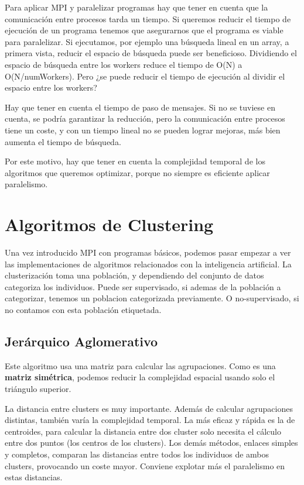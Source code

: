 \vspace*{0.3cm}

Para aplicar MPI y paralelizar programas hay que tener en cuenta que la comunicación entre procesos tarda un tiempo. Si queremos reducir el tiempo de ejecución de un programa tenemos que asegurarnos que el programa es viable para paralelizar. Si ejecutamos, por ejemplo una búsqueda lineal en un array, a primera vista, reducir el espacio de búsqueda puede ser beneficioso. Dividiendo el espacio de búsqueda entre los workers reduce el tiempo de O(N) a O(N/numWorkers). Pero ¿se puede reducir el tiempo de ejecución al dividir el espacio entre los workers? 

Hay que tener en cuenta el tiempo de paso de mensajes. Si no se tuviese en cuenta, se podría garantizar la reducción, pero la comunicación entre procesos tiene un coste, y con un tiempo lineal no se pueden lograr mejoras, más bien aumenta el tiempo de búsqueda.

Por este motivo, hay que tener en cuenta la complejidad temporal de los algoritmos que queremos optimizar, porque no siempre es eficiente aplicar paralelismo.

\newpage 

\section{Algoritmos de Clustering}

Una vez introducido MPI con programas básicos, podemos pasar empezar a ver las implementaciones de algoritmos relacionados con la inteligencia artificial. La clusterización toma una población, y dependiendo del conjunto de datos categoriza los individuos. Puede ser supervisado, si ademas de la población a categorizar, tenemos un poblacion categorizada previamente. O no-supervisado, si no contamos con esta población etiquetada.

	\subsection{Jerárquico Aglomerativo}
		Este algoritmo usa una matriz para calcular las agrupaciones. Como es una \textbf{matriz simétrica}, podemos reducir la complejidad espacial usando solo el triángulo superior. 
		
		La distancia entre clusters es muy importante. Además de calcular agrupaciones distintas, también varía la complejidad temporal. La más eficaz y rápida es la de centroides, para calcular la distancia entre dos cluster solo necesita el cálculo entre dos puntos (los centros de los clusters). Los demás métodos, enlaces simples y completos, comparan las distancias entre todos los individuos de ambos clusters, provocando un coste mayor. Conviene explotar más el paralelismo en estas distancias.
		
